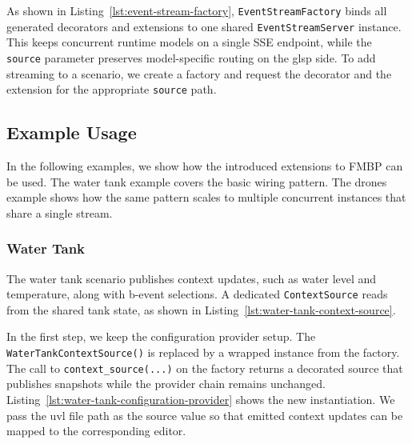
 
As shown in Listing~\ref{lst:event-stream-factory}, \texttt{EventStreamFactory} binds all generated decorators and extensions to one shared \texttt{EventStreamServer} instance.
This keeps concurrent runtime models on a single SSE endpoint, while the \texttt{source} parameter preserves model-specific routing on the \gls{glsp} side.
To add streaming to a scenario, we create a factory and request the decorator and the extension for the appropriate \texttt{source} path.

\subsection{Example Usage}
\label{subsec:impl_fmbp_examples}
 
In the following examples, we show how the introduced extensions to FMBP can be used.
The water tank example covers the basic wiring pattern.
The drones example shows how the same pattern scales to multiple concurrent instances that share a single stream.

\subsubsection{Water Tank}
\label{subsubsec:impl_fmbp_examples_water_tank}
 
The water tank scenario publishes context updates, such as water level and temperature, along with b-event selections.
A dedicated \texttt{ContextSource} reads from the shared tank state, as shown in Listing~\ref{lst:water-tank-context-source}.
 

 
In the first step, we keep the configuration provider setup.
The \texttt{WaterTankContextSource()} is replaced by a wrapped instance from the factory.
The call to \texttt{context\_source(...)} on the factory returns a decorated source that publishes snapshots while the provider chain remains unchanged.
Listing~\ref{lst:water-tank-configuration-provider} shows the new instantiation.
We pass the \gls{uvl} file path as the source value so that emitted context updates can be mapped to the corresponding editor.
 
